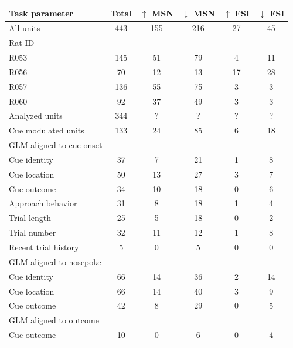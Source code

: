 \documentclass[11pt]{article}
\begin{document}
{\begin{table}[p]
\centering
\setlength{\tabcolsep}{1 em} %
\begin{tabular}{l c  c c c c}

Task parameter                                 & Total        & $\uparrow$ MSN        & $\downarrow$ MSN        & $\uparrow$ FSI       & $\downarrow$ FSI\\
\hline
All units                       & 443        & 155         & 216          & 27          & 45\\
\hline
Rat ID                       &         &       &          &          &\\
\hline
R053                       & 145         & 51          & 79          & 4         & 11\\
\hline
R056                       & 70         & 12          & 13         & 17          & 28\\
\hline
R057   	          & 136         & 55          & 75          & 3          & 3\\
\hline
R060                       & 92         & 37          & 49          & 3          & 3\\
\hline 
Analyzed units                       & 344        & ?         & ?         & ?          & ?\\
\hline
Cue modulated units                      & 133         &24          &85          & 6          &18\\
\hline
GLM aligned to cue-onset                       &         &       &          &          &\\
\hline
Cue identity       & 37         & 7          & 21          & 1          & 8\\
\hline
Cue location       & 50         &13          & 27          & 3          & 7\\
\hline
Cue outcome       & 34         & 10          & 18        & 0          & 6\\
\hline
Approach behavior      & 31         & 8          & 18          & 1          & 4\\
\hline
Trial length       & 25        & 5          & 18         & 0         & 2\\
\hline
Trial number       & 32         & 11          & 12         & 1          & 8\\
\hline
Recent trial history       & 5         & 0          &5          & 0          & 0\\
\hline
GLM aligned to nosepoke                       &         &       &          &          &\\
\hline
Cue identity       & 66         &14          & 36          & 2          &14\\
\hline
Cue location       & 66         &14          & 40          & 3          & 9\\
\hline
Cue outcome       & 42        & 8          & 29        & 0          & 5\\
\hline
GLM aligned to outcome                       &         &       &          &          &\\
\hline
Cue outcome       & 10        & 0          & 6       & 0          &4\\
\hline


\end{tabular}
\end{table}}
\end{document}
